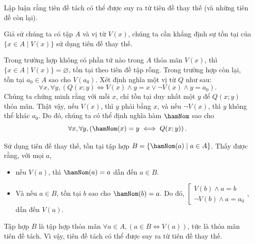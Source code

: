 \exercise Lập luận rằng tiên đề tách có thể được suy ra từ tiên đề thay thế (và những tiên đề còn lại).

\solution

Giả sử chúng ta có tập $A$ và vị từ $V(x)$, chúng ta cần khẳng định sự tồn tại của $\{x \in A \mid V(x)\}$ sử dụng tiên đề thay thế. 

Trong trường hợp không có phần tử nào trong $A$ thỏa mãn $V(x)$, thì $\{x \in A \mid V(x)\} = \varnothing$, tồn tại theo tiên đề tập rỗng. Trong trường hợp còn lại, tồn tại $a_0 \in A$ sao cho $V(a_0)$. Xét định nghĩa một vị từ $Q$ như sau:
\begin{equation*}
   \forall x, \forall y, \left( Q(x; y) \iff V(x) \land y = x \lor \neg V(x) \land y = a_0 \right).
\end{equation*}
Chúng ta chứng minh rằng với mỗi $x$, chỉ tồn tại duy nhất một $y$ để $Q(x; y)$ thỏa mãn. Thật vậy, nếu $V(x)$, thì $y$ phải bằng $x$, và nếu $\neg V(x)$, thì $y$ không thể khác $a_0$. Do đó, chúng ta có thể định nghĩa hàm $\hamNom$ sao cho $$
   \forall x, \forall y, \left(\hamNom(x) = y \iff Q(x; y)\right).
$$

Sử dụng tiên đề thay thế, tồn tại tập hợp $B = \left\{\hamNom(a) \mid a \in A\right\}$. Thấy được rằng, với mọi $a$, 
\begin{itemize}
   \item nếu $V(a)$, thì $\hamNom(a) = a$ dẫn đến $a \in B$. 
   \item Và nếu $a \in B$, tồn tại $b$ sao cho $\hamNom(b) = a$. Do đó, $\left[\begin{array}{l}
      V(b) \land a = b \\ \neg V(b) \land a = a_0
   \end{array}\right.$, dẫn đến $V(a)$.
\end{itemize}
Tập hợp $B$ là tập hợp thỏa mãn $\forall a \in A, (a \in B \iff V(a))$, tức là thỏa mãn tiên đề tách. Vì vậy, tiên đề tách có thể được suy ra từ tiên đề thay thế.